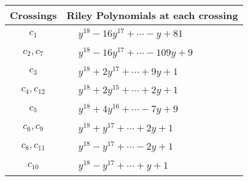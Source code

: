 \documentclass[1p]{elsarticle_modified}
\theoremstyle{definition}
\begin{document}
\begin{tabular}{m{50pt}|m{274pt}}
Crossings & \hspace{64pt}Riley Polynomials at each crossing \\
\hline $$\begin{aligned}c_{1}\end{aligned}$$&$\begin{aligned}
&y^{18}-16 y^{17}+\cdots- y+81
\end{aligned}$\\
\hline $$\begin{aligned}c_{2},c_{7}\end{aligned}$$&$\begin{aligned}
&y^{18}-16 y^{17}+\cdots-109 y+9
\end{aligned}$\\
\hline $$\begin{aligned}c_{3}\end{aligned}$$&$\begin{aligned}
&y^{18}+2 y^{17}+\cdots+9 y+1
\end{aligned}$\\
\hline $$\begin{aligned}c_{4},c_{12}\end{aligned}$$&$\begin{aligned}
&y^{18}+2 y^{15}+\cdots+2 y+1
\end{aligned}$\\
\hline $$\begin{aligned}c_{5}\end{aligned}$$&$\begin{aligned}
&y^{18}+4 y^{16}+\cdots-7 y+9
\end{aligned}$\\
\hline $$\begin{aligned}c_{6},c_{9}\end{aligned}$$&$\begin{aligned}
&y^{18}+y^{17}+\cdots+2 y+1
\end{aligned}$\\
\hline $$\begin{aligned}c_{8},c_{11}\end{aligned}$$&$\begin{aligned}
&y^{18}- y^{17}+\cdots-2 y+1
\end{aligned}$\\
\hline $$\begin{aligned}c_{10}\end{aligned}$$&$\begin{aligned}
&y^{18}- y^{17}+\cdots+y+1
\end{aligned}$\\
\hline
\end{tabular}\\~\\
\end{document}

